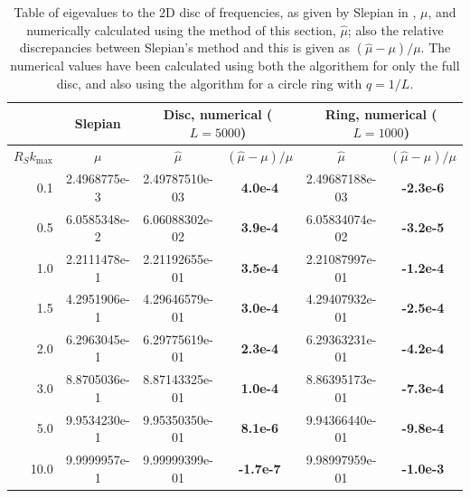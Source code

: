 \documentclass[11pt,a4paper, 
swedish,english %
]{article}
\begin{document}
\begin{table}
\centering
\caption{Table of eigevalues to the 2D disc of frequencies, as given
  by Slepian in \cite{PSWF-IV_1964}, $\mu$, and numerically
  calculated using the method of this section, $\hat\mu$; also the
  relative discrepancies between Slepian's method and this is given as
  $(\hat\mu-\mu)/\mu$. The numerical values have been
  calculated using both the algorithem for only the full disc, and
  also using the algorithm for a circle ring with $q=1/L$.
}
\label{tab:verification}
\begin{tabular}{|r|c|c|c|c|c|}\cline{2-6}
\multicolumn{1}{c|}{}
&Slepian\cite{PSWF-IV_1964}&
\multicolumn{2}{|c|}{Disc, numerical ($L=5000$)}&
\multicolumn{2}{|c|}{Ring, numerical ($L=1000$)}
\\ \hline
$R_Sk_{\max}$\phantom{1.}&$\mu$
&$\hat\mu$&$(\hat\mu-\mu)/\mu$
&$\hat\mu$&$(\hat\mu-\mu)/\mu$
\\ \hline
  0.1 & 2.4968775e-3 & 
2.49787510e-03 &\bf\phantom{-}4.0e-4&  
2.49687188e-03 &\bf-2.3e-6
\\ \hline
  0.5 & 6.0585348e-2 & 
6.06088302e-02 &\bf\phantom{-}3.9e-4&  
6.05834074e-02 &\bf-3.2e-5
\\ \hline
  1.0 & 2.2111478e-1 & 
2.21192655e-01 &\bf\phantom{-}3.5e-4&  
2.21087997e-01 &\bf-1.2e-4
\\ \hline
  1.5 & 4.2951906e-1 & 
4.29646579e-01 &\bf\phantom{-}3.0e-4&  
4.29407932e-01 &\bf-2.5e-4
\\ \hline
  2.0 & 6.2963045e-1 & 
6.29775619e-01 &\bf\phantom{-}2.3e-4&  
6.29363231e-01 &\bf-4.2e-4
\\ \hline
  3.0 & 8.8705036e-1 & 
8.87143325e-01 &\bf\phantom{-}1.0e-4&  
8.86395173e-01 &\bf-7.3e-4
\\ \hline
  5.0 & 9.9534230e-1 & 
9.95350350e-01 &\bf\phantom{-}8.1e-6&  
9.94366440e-01 &\bf-9.8e-4
\\ \hline
 10.0 & 9.9999957e-1 & 
9.99999399e-01 &\bf\phantom{}-1.7e-7&  
9.98997959e-01 &\bf-1.0e-3
\\ \hline
\end{tabular}
\end{table}


\end{document}

